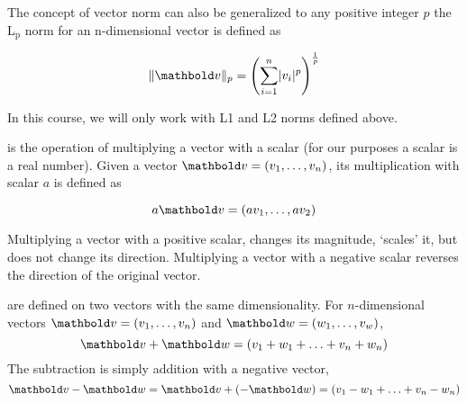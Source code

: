 The concept of vector norm
can also be generalized to any positive integer $p$
the L$_{\text{p}}$ norm for an n-dimensional vector is defined as

\[
  \norm{\vect{v}}_{p} = \left(
          \sum_{i=1}^{n} \lvert{}v_{i}\rvert^{p}
        \right)^\frac{1}{p}
\]

In this course, we will only work with L1 and L2 norms defined above.

 is the operation of
multiplying a vector with a scalar
(for our purposes a scalar is a real number).
Given a vector $\vect{v} = (v_{1},\ldots, v_{n})$,
its multiplication with scalar $a$ is defined as

\[
  a \vect{v} = (a v_{1}, \ldots, a v_{2})
\]

Multiplying a vector with a positive scalar,
changes its magnitude, `scales' it,
but does not change its direction.
Multiplying a vector with a negative scalar
reverses the direction of the original vector.

\begin{marginfigure}[-5ex]
  \caption{\label{fig:scalar-multipl}%
    Scalar multiplication.
  }
\end{marginfigure}

are defined on two vectors with the same dimensionality.
For $n$-dimensional vectors $\vect{v} = (v_{1}, \ldots, v_{n})$
and $\vect{w} = (w_{1}, \ldots, v_{w})$,
\[
  \vect{v} + \vect{w} = (v_{1} + w_{1} + \ldots + v_{n} + w_{n})
\]
The subtraction is simply addition with a negative vector,
\[
  \vect{v} - \vect{w} = \vect{v} + (-\vect{w}) = (v_{1} - w_{1} + \ldots + v_{n} - w_{n})
\]


